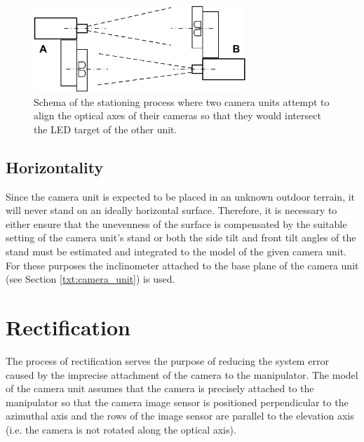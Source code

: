 \begin{figure}[htb]
	\centering
	\includegraphics[width=8cm]{fig/stationing_aiming.png}
	\caption{Schema of the stationing process where two camera units attempt to align the optical axes of their cameras so that they would intersect the LED target of the other unit.}
	\label{fig:stationing_aiming}
\end{figure}


\subsection{Horizontality}
Since the camera unit is expected to be placed in an unknown outdoor terrain, it will never stand on an ideally horizontal surface. Therefore, it is necessary to either ensure that the unevenness of the surface is compensated by the suitable setting of the camera unit's stand or both the side tilt and front tilt angles of the stand must be estimated and integrated to the model of the given camera unit. For these purposes the inclinometer attached to the base plane of the camera unit (see Section \ref{txt:camera_unit}) is used.


\section{Rectification}

The process of rectification serves the purpose of reducing the system error caused by the imprecise attachment of the camera to the manipulator. The model of the camera unit assumes that the camera is precisely attached to the manipulator so that the camera image sensor is positioned perpendicular to the azimuthal axis and the rows of the image sensor are parallel to the elevation axis (i.e. the camera is not rotated along the optical axis).

